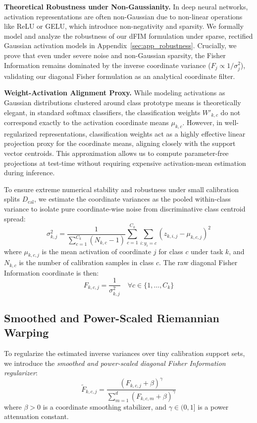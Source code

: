 \textbf{Theoretical Robustness under Non-Gaussianity.} In deep neural networks, activation representations are often non-Gaussian due to non-linear operations like ReLU or GELU, which introduce non-negativity and sparsity. We formally model and analyze the robustness of our dFIM formulation under sparse, rectified Gaussian activation models in Appendix~\ref{sec:app_robustness}. Crucially, we prove that even under severe noise and non-Gaussian sparsity, the Fisher Information remains dominated by the inverse coordinate variance ($F_j \propto 1/\sigma_j^2$), validating our diagonal Fisher formulation as an analytical coordinate filter.

\textbf{Weight-Activation Alignment Proxy.} While modeling activations as Gaussian distributions clustered around class prototype means is theoretically elegant, in standard softmax classifiers, the classification weights $W'_{k, c}$ do not correspond exactly to the activation coordinate means $\mu_{k, c}$. However, in well-regularized representations, classification weights act as a highly effective linear projection proxy for the coordinate means, aligning closely with the support vector centroids. This approximation allows us to compute parameter-free projections at test-time without requiring expensive activation-mean estimation during inference.

To ensure extreme numerical stability and robustness under small calibration splits $D_{\text{cal}}$, we estimate the coordinate variances as the pooled within-class variance to isolate pure coordinate-wise noise from discriminative class centroid spread:
\begin{equation}
\sigma_{k, j}^2 = \frac{1}{\sum_{c=1}^{C_k} (N_{k, c} - 1)} \sum_{c=1}^{C_k} \sum_{i: y_i = c} \left( z_{k, i, j} - \mu_{k, c, j} \right)^2
\end{equation}
where $\mu_{k, c, j}$ is the mean activation of coordinate $j$ for class $c$ under task $k$, and $N_{k, c}$ is the number of calibration samples in class $c$. The raw diagonal Fisher Information coordinate is then:
\begin{equation}
F_{k, c, j} = \frac{1}{\sigma_{k, j}^2} \quad \forall c \in \{1,\dots,C_k\}
\end{equation}

\subsection{Smoothed and Power-Scaled Riemannian Warping}
To regularize the estimated inverse variances over tiny calibration support sets, we introduce the \emph{smoothed and power-scaled diagonal Fisher Information regularizer}:
\begin{equation}
\tilde{F}_{k, c, j} = \frac{\left( F_{k, c, j} + \beta \right)^\gamma}{\sum_{m=1}^d \left( F_{k, c, m} + \beta \right)^\gamma}
\end{equation}
where $\beta > 0$ is a coordinate smoothing stabilizer, and $\gamma \in (0, 1]$ is a power attenuation constant. 

